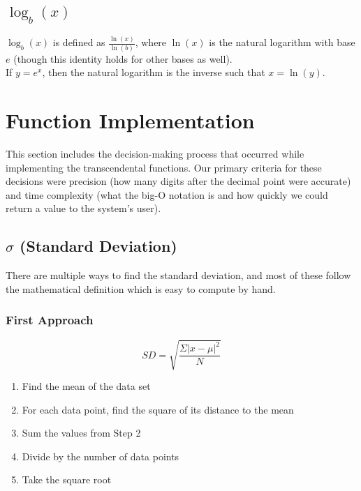 \documentclass[11pt,onside]{report}
\begin{document}
\subsection{$\log_b(x)$}
$\log_b(x)$ is defined as $\frac{\ln(x)}{\ln(b)}$, where $\ln(x)$ is the natural logarithm with base $e$ (though this identity holds for other bases as well). \cite{log}\\

If $y = e^x$, then the natural logarithm is the inverse such that $x = \ln(y)$. \cite{ln}

\section{Function Implementation}
This section includes the decision-making process that occurred while implementing the transcendental functions. Our primary criteria for these decisions were precision (how many digits after the decimal point were accurate) and time complexity (what the big-O notation is and how quickly we could return a value to the system's user).

\subsection{$\sigma$ (Standard Deviation)}
There are multiple ways to find the standard deviation, and most of these follow the mathematical definition which is easy to compute by hand.

\subsubsection{First Approach}
\begin{equation}
    SD = \sqrt{\frac{\Sigma |x-\mu|^2}{N}}
\end{equation}
\begin{enumerate}
    \item Find the mean of the data set
    \item For each data point, find the square of its distance to the mean
    \item Sum the values from Step 2
    \item Divide by the number of data points
    \item Take the square root
\end{enumerate}
\end{document}
